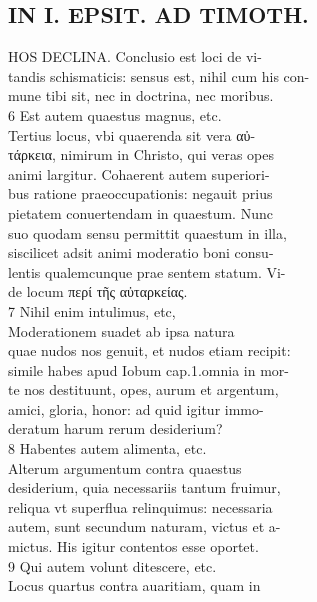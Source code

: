 \documentclass{article}
\begin{document}
\begin{pages}
\section*{IN I. EPSIT. AD TIMOTH. \\
                }
HOS DECLINA. Conclusio est loci de vi- \\
                tandis schismaticis: sensus est, nihil cum his con- \\
                mune tibi sit, nec in doctrina, nec moribus. \\
                6 Est autem quaestus magnus, etc. \\
                Tertius locus, vbi quaerenda sit vera αὐ- \\
                τάρκεια, nimirum in Christo, qui veras opes \\
                animi largitur. Cohaerent autem superiori- \\
                bus ratione praeoccupationis: negauit prius \\
                pietatem conuertendam in quaestum. Nunc \\
                suo quodam sensu permittit quaestum in illa, \\
                siscilicet adsit animi moderatio boni consu- \\
                lentis qualemcunque prae sentem statum. Vi- \\
                de locum περί τῆς αὐταρκείας. \\
                7 Nihil enim intulimus, etc, \\
                Moderationem suadet ab ipsa natura \\
                quae nudos nos genuit, et nudos etiam recipit: \\
                simile habes apud Iobum cap.1.omnia in mor- \\
                te nos destituunt, opes, aurum et argentum, \\
                amici, gloria, honor: ad quid igitur immo- \\
                deratum harum rerum desiderium? \\
                8 Habentes autem alimenta, etc. \\
                Alterum argumentum contra quaestus \\
                desiderium, quia necessariis tantum fruimur, \\
                reliqua vt superflua relinquimus: necessaria \\
                autem, sunt secundum naturam, victus et a- \\
                mictus. His igitur contentos esse oportet. \\
                9 Qui autem volunt ditescere, etc. \\
                Locus quartus contra auaritiam, quam in \\
                

\end{pages}
\end{document}
